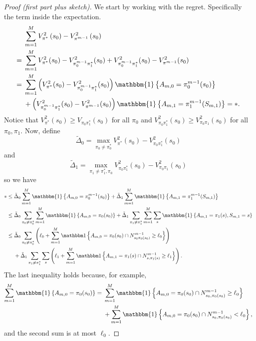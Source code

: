\documentclass[11pt]{article}
\begin{document}
\begin{proof}[Proof (first part plus sketch)] 
	We start by working with the regret. Specifically the term inside the expectation.
	\begin{align*}
		& \sum_{m=1}^{M} V_{\pi^*}^{2}\left(s_{0}\right) - V_{\pi^{m-1}}^{2}\left(s_{0}\right) \\
		={}& \sum_{m=1}^{M} V_{\pi^*}^{2}(s_{0}) - V_{\pi_{0}^{m-1}\pi_{1}^{*}}^{2}(s_{0}) + V_{\pi_{0}^{m-1}\pi_{1}^{*}}^{2}(s_{0}) - V_{\pi^{m-1}}^{2}(s_{0}) \\
		={}& \sum_{m=1}^{M} \left(V_{\pi^*}^{2}(s_{0}) - V_{\pi_{0}^{m-1}\pi_{1}^{*}}^{2}(s_{0})\right) \mathbbm{1}\left\{A_{m,0} = \pi_{0}^{m-1}(s_{0})\right\} \\
		&{}+ \left(V_{\pi_{0}^{m-1}\pi_{1}^{*}}^{2}(s_{0}) - V_{\pi^{m-1}}^{2}(s_{0})\right) \mathbbm{1}\left\{A_{m,1} = \pi_{1}^{m-1}(S_{m,1})\right\} = *.
	\end{align*}
	Notice that $V_{\pi^*}^{2}(s_{0}) \geq V_{\pi_{0}\pi_{1}^{*}}(s_{0})$ for all $\pi_{0}$ and $V^2_{\pi_0\pi_{1}^{*}}(s_{0}) \geq V_{\pi_{0}\pi_{1}}^{2}(s_{0})$ for all $\pi_{0}, \pi_{1}$. Now, define 
	\[
		\tilde{\Delta}_{0} = \max_{\pi_{0}\neq \pi_{0}^{*}} V_{\pi^*}^{2}(s_{0}) - V_{\pi_0\pi_1^*}^{2}(s_{0})
	\]
	and 
	\[
		\tilde{\Delta}_{1} = \max_{\pi_{1} \neq \pi_{1}^{*}, \pi_{0}} V_{\pi_{0}\pi_{1}^{*}}^{2}(s_{0}) - V_{\pi_{0}\pi_{1}}^{2}(s_{0})
	\]
	so we have
	\begin{align*}
		* \leq{}& \tilde{\Delta}_{0} \sum_{m=1}^{M} \mathbbm{1}\left\{A_{m,0} = \pi_{0}^{m-1}(s_{0})\right\} + \tilde{\Delta}_{1} \sum_{m=1}^{M} \mathbbm{1}\left\{A_{m,1} = \pi_{1}^{m-1}(S_{m,1})\right\} \\
		\leq{}& \tilde{\Delta}_{0} \sum_{\pi_{0}\neq \pi_{0}^{*}}\sum_{m=1}^{M} \mathbbm{1}\left\{A_{m,0} = \pi_{0}(s_{0})\right\} + \tilde{\Delta}_{1} \sum_{\pi_{1}\neq\pi_{1}^{*}} \sum_{m=1}^{M} \sum_{s} \mathbbm{1}\left\{A_{m,1} = \pi_{1}(s), S_{m,1} = s\right\} \\
		\leq{}& \tilde{\Delta}_{0} \sum_{\pi_{0}\neq\pi_{0}^*} \left(\ell_{0} + \sum_{m=1}^{M} \ind\left\{A_{m,0} = \pi_{0}(s_{0}) \cap N_{s_{0}\pi_{0}(s_{0})}^{m-1} \geq \ell_{0}\right\}\right) \\
		&{}+ \tilde{\Delta}_{1} \sum_{\pi_{1} \neq \pi_{1}^{*}} \sum_{s} \left(\ell_{1} + \sum_{m=1}^{M} \ind\left\{A_{m,1} = \pi_{1}(s) \cap N_{s, \pi_{1}(s)}^{m-1} \geq \ell_{1}\right\}\right).
	\end{align*}
	The last inequality holds because, for example,
	\begin{align*}
		\sum_{m=1}^{M} \mathbbm{1}\left\{A_{m,0} = \pi_{0}(s_{0})\right\} ={}& \sum_{m=1}^{M} \mathbbm{1}\left\{A_{m,0} = \pi_{0}(s_{0}) \cap N_{s_{0},\pi_{0}(s_{0})}^{m-1} \geq \ell_{0}\right\} \\
		&{}+ \sum_{m=1}^{M} \mathbbm{1}\left\{A_{m,0} = \pi_{0}(s_{0}) \cap N_{s_{0},\pi_{0}(s_{0})}^{m-1} < \ell_{0}\right\},
	\end{align*}
	and the second sum is at most $\ell_{0}$. 
	

\end{proof}
\end{document}
